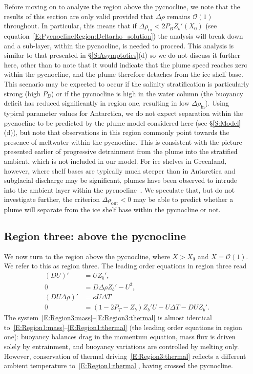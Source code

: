 \documentclass[openacc]{rsproca_new}%
\newcommand{\order}[1]{\mathcal{O}(#1)}
\newcommand{\Pb}{\textit{P}_B}  %
\newcommand{\Pt}{\textit{P}_T}
\renewcommand{\in}{\text{in}} %
\newcommand{\out}{\text{out}}
\begin{document}
Before moving on to analyze the  region above the pycnocline, we note that the results of this section are only valid provided that $\Delta \rho$ remains $\order{1}$ throughout. In particular, this means that if $\Delta \rho_{\in} < 2 \Pb Z_b'(X_0)$ (see equation~\eqref{E:PycnoclineRegion:Deltarho_solution}) the analysis will break down and a sub-layer, within the pycnocline, is needed to proceed. This analysis is similar to that presented in \S\ref{S:Asymptotics}(d) so we do not discuss it further here, other than to note that it would indicate that the plume speed reaches zero within the pycnocline, and the plume therefore detaches from the ice shelf base. This scenario may be expected to occur if the salinity stratification is particularly strong (high $\Pb$) or if the pycnocline is high in the water column (the buoyancy deficit has reduced significantly in region one, resulting in low $\Delta \rho_{\in}$). Using typical parameter values for Antarctica, we do not expect separation within the pycnocline to be predicted by the plume model considered here (see \S\ref{S:Model}(d)), but note that observations in this region commonly point towards the presence of meltwater within the pycnocline. This is consistent with the picture presented earlier of progressive detrainment from the plume into the stratified ambient, which is not included in our model. For ice shelves in Greenland, however, where shelf bases are typically much steeper than in Antarctica and subglacial discharge may be significant, plumes have been observed to intrude into the ambient layer within the pycnocline~\citep{Straneo2011NatureGeo}. We speculate that, but do not investigate further, the criterion $\Delta \rho_\out < 0$  may be able to predict whether a plume will separate from the ice shelf base within the pycnocline or not.

\subsection{Region three: above the pycnocline}\label{S:Asymptotics:Region3}
We now turn to the region above the pycnocline,  where $X > X_0$ and $X = \order{1}$. We refer to this as region three. The leading order equations in region three read
\begin{align}
 (DU)' &= U Z_b',\label{E:Region3:mass}\\
0 &= D \Delta \rho Z_b' - U^2, \label{E:Region3:mom}\\
(DU\Delta \rho)'  &=\kappa U \Delta T\label{E:Region3:buoyancy}\\
0&= (1  - 2\Pt -  Z_b)Z_b'U- U\Delta T - DU Z_b'.\label{E:Region3:thermal}
\end{align}
The system~\eqref{E:Region3:mass}--\eqref{E:Region3:thermal} is almost identical to~\eqref{E:Region1:mass}--\eqref{E:Region1:thermal} (the leading order equations in region one): buoyancy balances drag in the momentum equation, mass flux is driven solely by entrainment, and buoyancy variations are controlled by melting only. However, conservation of thermal driving~\eqref{E:Region3:thermal} reflects a different ambient temperature to~\eqref{E:Region1:thermal}, having crossed the pycnocline.
\end{document}
